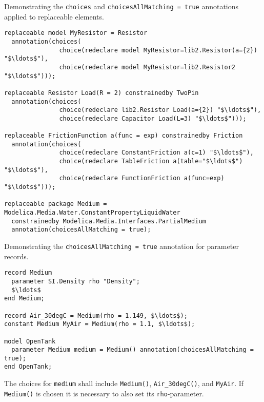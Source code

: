 \begin{example}
Demonstrating the \lstinline!choices! and  \lstinline!choicesAllMatching = true! annotations applied to replaceable elements.
\begin{lstlisting}[language=modelica]
replaceable model MyResistor = Resistor
  annotation(choices(
               choice(redeclare model MyResistor=lib2.Resistor(a={2}) "$\ldots$"),
               choice(redeclare model MyResistor=lib2.Resistor2 "$\ldots$")));

replaceable Resistor Load(R = 2) constrainedby TwoPin
  annotation(choices(
               choice(redeclare lib2.Resistor Load(a={2}) "$\ldots$"),
               choice(redeclare Capacitor Load(L=3) "$\ldots$")));

replaceable FrictionFunction a(func = exp) constrainedby Friction
  annotation(choices(
               choice(redeclare ConstantFriction a(c=1) "$\ldots$"),
               choice(redeclare TableFriction a(table="$\ldots$") "$\ldots$"),
               choice(redeclare FunctionFriction a(func=exp) "$\ldots$")));

replaceable package Medium = Modelica.Media.Water.ConstantPropertyLiquidWater
  constrainedby Modelica.Media.Interfaces.PartialMedium
  annotation(choicesAllMatching = true);
\end{lstlisting}
\end{example}

\begin{example}
Demonstrating the \lstinline!choicesAllMatching = true! annotation for parameter records.
\begin{lstlisting}[language=modelica]
record Medium
  parameter SI.Density rho "Density";
  $\ldots$
end Medium;

record Air_30degC = Medium(rho = 1.149, $\ldots$);
constant Medium MyAir = Medium(rho = 1.1, $\ldots$);

model OpenTank
  parameter Medium medium = Medium() annotation(choicesAllMatching = true);
end OpenTank;
\end{lstlisting}
The choices for \lstinline!medium! shall include \lstinline!Medium()!, \lstinline!Air_30degC()!, and \lstinline!MyAir!.
If \lstinline!Medium()! is chosen it is necessary to also set its \lstinline!rho!-parameter.
\end{example}

